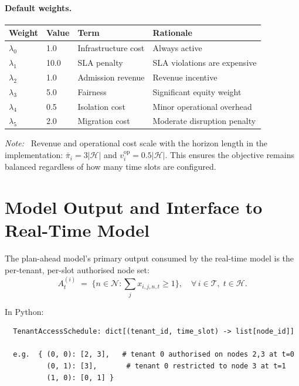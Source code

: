 \documentclass[11pt,a4paper]{article}
\newcommand{\cT}{\mathcal{T}}           %
\newcommand{\cN}{\mathcal{N}}           %
\newcommand{\cH}{\mathcal{H}}           %
\newenvironment{note}{\smallskip\noindent\textcolor{notegrey}{\textit{Note:\ }}}{\smallskip}
\begin{document}
\paragraph{Default weights.}
\begin{center}
\begin{tabular}{@{}llll@{}}
  \toprule
  Weight & Value & Term & Rationale \\
  \midrule
  $\lambda_0$ & 1.0  & Infrastructure cost  & Always active \\
  $\lambda_1$ & 10.0 & SLA penalty          & SLA violations are expensive \\
  $\lambda_2$ & 1.0  & Admission revenue    & Revenue incentive \\
  $\lambda_3$ & 5.0  & Fairness             & Significant equity weight \\
  $\lambda_4$ & 0.5  & Isolation cost       & Minor operational overhead \\
  $\lambda_5$ & 2.0  & Migration cost       & Moderate disruption penalty \\
  \bottomrule
\end{tabular}
\end{center}

\begin{note}
  Revenue and operational cost scale with the horizon length in the
  implementation: $\bar{\pi}_i = 3|\cH|$ and $v_i^{\text{op}} = 0.5|\cH|$.
  This ensures the objective remains balanced regardless of how many time
  slots are configured.
\end{note}

\section{Model Output and Interface to Real-Time Model}

The plan-ahead model's primary output consumed by the real-time model is
the per-tenant, per-slot authorised node set:
\[
  A_t^{(i)} \;=\; \bigl\{n\in\cN : \textstyle\sum_j x_{i,j,n,t} \ge 1\bigr\},
  \quad \forall\,i\in\cT,\;t\in\cH.
\]

In Python:
\begin{verbatim}
  TenantAccessSchedule: dict[(tenant_id, time_slot) -> list[node_id]]

  e.g.  { (0, 0): [2, 3],   # tenant 0 authorised on nodes 2,3 at t=0
          (0, 1): [3],       # tenant 0 restricted to node 3 at t=1
          (1, 0): [0, 1] }
\end{verbatim}
\end{document}
